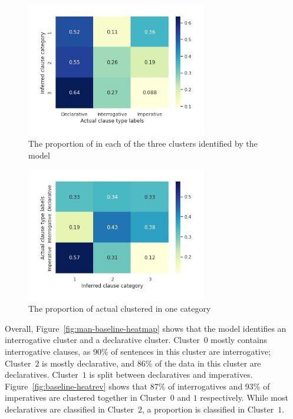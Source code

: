 \begin{figure}[H]
    \centering
    \includegraphics[width=0.7\textwidth]{figures/man-baseline-mid-heat.jpg}
    \caption{The proportion of \diis{} in each of the three clusters identified by the \dlearnerabbr{} model}
    \label{fig:man-baseline-mid-heat}
\end{figure}


\begin{figure}[H]
    \centering
    \includegraphics[width=0.7\textwidth]{figures/man-baseline-mid-heatrev.jpg}
    \caption{The proportion of actual \diis{} clustered in one category}
    \label{fig:man-baseline-mid-heatrev}
\end{figure}

Overall, Figure~\ref{fig:man-baseline-heatmap} shows that the \dlearnerabbr{} model identifies an interrogative cluster and a declarative cluster. Cluster~$0$ mostly contains interrogative clauses, as 90\% of sentences in this cluster are interrogative; Cluster~$2$ is mostly declarative, and 86\% of the data in this cluster are declaratives. Cluster~$1$ is split between declaratives and imperatives. Figure~\ref{fig:baseline-heatrev} shows that 87\% of interrogatives and 93\% of imperatives are clustered together in Cluster~$0$ and $1$ respectively. While most declaratives are classified in Cluster~$2$, a proportion is classified in Cluster~$1$.

